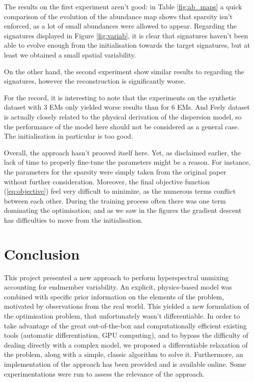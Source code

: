 \documentclass{article}
\begin{document}
The results on the first experiment aren't good: in Table \ref{fig:ab_maps} a quick comparison of the evolution of the abundance map shows that sparsity isn't enforced, as a lot of small abundances were allowed to appear. Regarding the signatures displayed in Figure \ref{fig:variab}, it is clear that signatures haven't been able to evolve enough from the initialisation towards the target signatures, but at least we obtained a small spatial variability.

On the other hand, the second experiment show similar results to \citet{janiczek_differentiable_2020} regarding the signatures, however the reconstruction is significantly worse.

For the record, it is interesting to note that the experiments on the synthetic dataset with 3 EMs only yielded worse results than for 6 EMs. And Feely dataset is actually closely related to the physical derivation of the dispersion model, so the performance of the model here should not be considered as a general case. The initialisation in particular is too good.

Overall, the approach hasn't prooved itself here. Yet, as disclaimed earlier, the lack of time to properly fine-tune the parameters might be a reason. For instance, the parameters for the sparsity were simply taken from the original paper without further consideration. Moreover, the final objective function (\ref{eq:objective}) feel very difficult to minimize, as the numerous terms conflict between each other. During the training process often there was one term dominating the optimisation; and as we saw in the figures the gradient descent has difficulties to move from the initialisation.


\section{Conclusion}\label{sec:conclu}

This project presented a new approach to perform hyperspectral unmixing accounting for endmember variability. An explicit, physics-based model was combined with specific prior information on the elements of the problem, motivated by observations from the real world. This yielded a new formulation of the optimisation problem, that unfortunately wasn't differentiable. In order to take advantage of the great out-of-the-box and computationally efficient existing tools (automatic differentiation, GPU computing), and to bypass the difficulty of dealing directly with a complex model, we proposed a differentiable relaxation of the problem, along with a simple, classic algorithm to solve it. Furthermore, an implementation of the approach has been provided and is available online. Some experimentations were run to assess the relevance of the approach.
\end{document}

